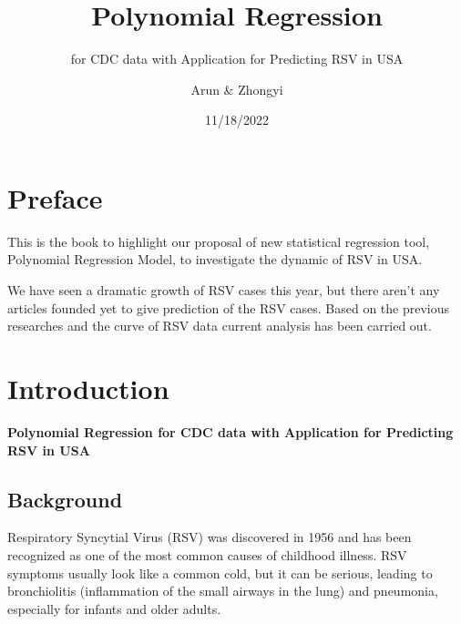 \documentclass[
  letterpaper,
  DIV=11,
  numbers=noendperiod]{scrreport}
\title{Polynomial Regression}
\subtitle{for CDC data with Application for Predicting RSV in USA}
\author{Arun \& Zhongyi}
\date{11/18/2022}
\renewcommand*\contentsname{Table of contents}
\newcommand\contentsname{Table of contents}
\begin{document}
\maketitle
\ifdefined\Shaded\renewenvironment{Shaded}{\begin{tcolorbox}[borderline west={3pt}{0pt}{shadecolor}, interior hidden, enhanced, boxrule=0pt, sharp corners, frame hidden, breakable]}{\end{tcolorbox}}\fi

\renewcommand*\contentsname{Table of contents}
{
\hypersetup{linkcolor=}
\setcounter{tocdepth}{2}
\tableofcontents
}

\hypertarget{preface}{%
\chapter*{Preface}\label{preface}}

This is the book to highlight our proposal of new statistical regression
tool, Polynomial Regression Model, to investigate the dynamic of RSV in
USA.

We have seen a dramatic growth of RSV cases this year, but there aren't
any articles founded yet to give prediction of the RSV cases. Based on
the previous researches and the curve of RSV data current analysis has
been carried out.


\hypertarget{introduction}{%
\chapter{Introduction}\label{introduction}}

\textbf{Polynomial Regression for CDC data with Application for
Predicting RSV in USA}

\hypertarget{background}{%
\section{Background}\label{background}}

Respiratory Syncytial Virus (RSV) was discovered in 1956 and has been
recognized as one of the most common causes of childhood illness. RSV
symptoms usually look like a common cold, but it can be serious, leading
to bronchiolitis (inflammation of the small airways in the lung) and
pneumonia, especially for infants and older adults.
\end{document}
